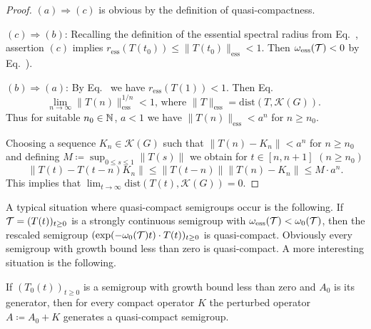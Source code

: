 \begin{proof}
$(a) \Rightarrow (c)$ is obvious by the definition of quasi-compactness.

$(c) \Rightarrow (b)$: Recalling the definition of the essential spectral radius from 
 Eq.~,
assertion $(c)$ implies 
$r_{\text{ess}}(T(t_0)) \leq \|T(t_0)\|_{\text{ess}} < 1 .$ 
Then  $\omega_{\text{ess}}(\mathcal{T}) < 0 $ by  
Eq.~).

$(b) \Rightarrow (a)$: By 
 Eq.~
we have $r_{\text{ess}}(T(1)) < 1$. 
Then 
 Eq.~
\[
\text{
$\lim_{n \to \infty}\|T(n)\|_{\text{ess}}^{1/n} < 1$,  where $\|T\|_{\text{ess}} = \mathrm{dist}(T,\mathcal{K}(G))$. }
\]
Thus for suitable $n_{0} \in \mathbb{N}$, $a < 1$ we have $\|T(n)\|_{\text{ess}} < a^n$ for $n \geq n_{0}$.

Choosing a sequence $K_n \in \mathcal{K}(G)$ such that $\|T(n) - K_n\| < a^n$ for $n \geq n_{0}$ and defining $M \coloneq \sup_{0 \leq s \leq 1}\|T(s)\|$ we obtain for $t \in [n,n+1]$ $(n \geq n_{0})$ 
\[
\|T(t) - T(t-n)K_n\| \leq \|T(t-n)\|\|T(n) - K_n\| \leq M \cdot a^n .
\] 
This implies that $\lim_{t \to \infty}\mathrm{dist}(T(t),\mathcal{K}(G)) = 0 $.
\end{proof}
A typical situation where quasi-compact semigroups occur is the following. 
If\/ $\TT = (T(t))_{t \geq 0}$ is a strongly continuous semigroup with $\omega_{\text{ess}}(\mathcal{T}) < \omega_{0}(\mathcal{T})$, then the rescaled semigroup $(\text{exp}(-\omega_{0}(\TT)t)\cdot T(t))_{t \geq 0}$ is quasi-compact. 
Obviously every semigroup with growth bound less than zero is quasi-compact. 
A more interesting situation is the following.

If\/ $(T_{0}(t))_{t \geq 0}$ is a semigroup with growth bound less than zero and $A_{0}$ is its generator, then for every compact operator $K$ the perturbed operator $A \coloneq A_{0} + K$ generates a quasi-compact semigroup.
	
